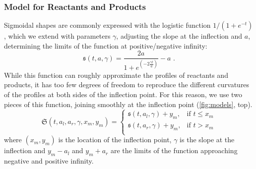 \subsubsection{Model for Reactants and Products} %
\label{ssub:model_for_reactants_products}
%
Sigmoidal shapes are commonly expressed with the logistic
function $1/(1+e^{-t})$, which we extend with parameters $\gamma$, adjusting
the slope at the inflection and $a$, determining the limits of the function at
positive/negative infinity:
%
\begin{equation}
	\mathfrak{s}(t,a,\gamma)
		= \frac{2a}{ 1 + e^{ (-2\frac{\gamma t}{a}) } } - a \text{ .}
\end{equation}
%
While this function can roughly approximate the profiles of reactants and
products, it has too few degrees of freedom to reproduce the different
curvatures of the profiles at both sides of the inflection point. For this
reason, we use two pieces of this function, joining smoothly at the inflection
point (\cref{fig:models}, top).
%
\begin{equation}
		\mathfrak{S}(t, a_l, a_r, \gamma, x_m, y_m) =
		\begin{cases}
			\mathfrak{s}(t, a_l, \gamma) + y_m, &\text{if }  t \leq x_m\\
			\mathfrak{s}(t, a_r, \gamma) + y_m, & \text{if }  t > x_m\\
		\end{cases}
\end{equation}
%
where $(x_m, y_m)$ is the location of the
inflection point, $\gamma$ is the slope at the inflection and $y_m-a_l$ and
$y_m+a_r$ are the limits of the function approaching negative and positive
infinity.
%
%

